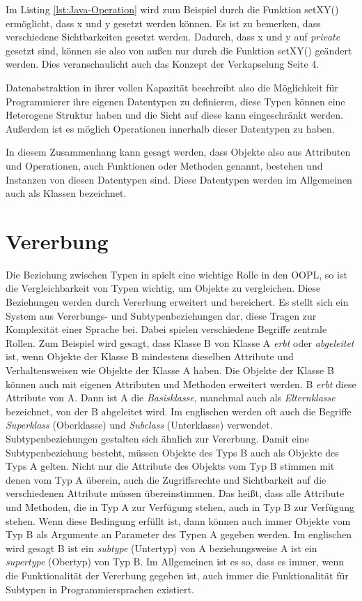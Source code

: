 \documentclass[
	12pt, %
	a4paper,
	listof=totoc, %
	bibliography=totoc, %
	numbers=noenddot, %
	ngerman, %
	headsepline, %
	oneside %
	]{scrbook} %
\begin{document}
Im Listing \ref{lst:Java-Operation} wird zum Beispiel durch die Funktion \glqq setXY()\grqq{} ermöglicht, dass x und y gesetzt werden können. Es ist zu bemerken, dass verschiedene Sichtbarkeiten gesetzt werden. Dadurch, dass x und y auf \emph{private} gesetzt sind, können sie also von außen nur durch die Funktion \glqq setXY()\grqq{} geändert werden.  
Dies veranschaulicht auch das Konzept der Verkapselung \cite{OOPL} Seite 4.  

Datenabstraktion in ihrer vollen Kapazität beschreibt also die Möglichkeit für Programmierer ihre eigenen Datentypen zu definieren, diese Typen können eine Heterogene Struktur haben und die Sicht auf diese kann eingeschränkt werden. Außerdem ist es möglich Operationen innerhalb dieser Datentypen zu haben.  

In diesem Zusammenhang kann gesagt werden, dass Objekte also aus Attributen und Operationen, auch Funktionen oder Methoden genannt, bestehen und Instanzen von diesen Datentypen sind. Diese Datentypen werden im Allgemeinen auch als Klassen bezeichnet.


\section{Vererbung}\label{sec:Vererbung}
Die Beziehung zwischen Typen in spielt eine wichtige Rolle in den \gls{OOPL}, so ist die Vergleichbarkeit von Typen wichtig, um Objekte zu vergleichen.  
Diese Beziehungen werden durch Vererbung erweitert und bereichert. Es stellt sich ein System aus Vererbungs- und Subtypenbeziehungen dar, diese Tragen zur Komplexität einer Sprache bei. Dabei spielen verschiedene Begriffe zentrale Rollen.  
Zum Beispiel wird gesagt, dass Klasse B von Klasse A \emph{erbt} oder \emph{abgeleitet} ist, wenn Objekte der Klasse B mindestens dieselben Attribute und Verhaltensweisen wie Objekte der Klasse A haben. Die Objekte der Klasse B können auch mit eigenen Attributen und Methoden erweitert werden.  
B \emph{erbt} diese Attribute von A. Dann ist A die \emph{Basisklasse}, manchmal auch als \emph{Elternklasse} bezeichnet, von der B abgeleitet wird.  
Im englischen werden oft auch die Begriffe \emph{Superklass} (Oberklasse) und \emph{Subclass} (Unterklasse) verwendet.  
Subtypenbeziehungen gestalten sich ähnlich zur Vererbung. Damit eine Subtypenbeziehung besteht, müssen Objekte des Typs B auch als Objekte des Typs A gelten. Nicht nur die Attribute des Objekts vom Typ B stimmen mit denen vom Typ A überein, auch die Zugriffsrechte und Sichtbarkeit auf die verschiedenen Attribute müssen übereinstimmen. Das heißt, dass alle Attribute und Methoden, die in Typ A zur Verfügung stehen, auch in Typ B zur Verfügung stehen.  
Wenn diese Bedingung erfüllt ist, dann können auch immer Objekte vom Typ B als Argumente an Parameter des Typen A gegeben werden. Im englischen wird gesagt B ist ein \emph{subtype} (Untertyp) von A beziehungsweise A ist ein \emph{supertype} (Obertyp) von Typ B. Im Allgemeinen ist es so, dass es immer, wenn die Funktionalität der Vererbung gegeben ist, auch immer die Funktionalität für Subtypen in Programmiersprachen existiert.  
  
\end{document}
